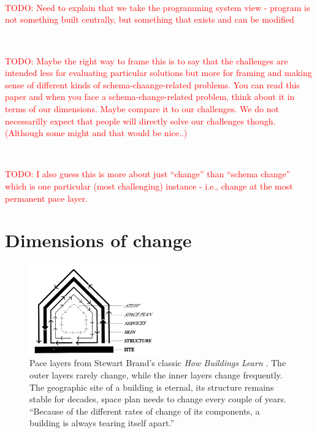 \documentclass[english,submission]{programming}
\begin{document}
~

~

~

\textcolor{red}{TODO: Need to explain that we take the programming system view - program is not something
built centrally, but something that exists and can be modified}

~

\textcolor{red}{TODO: Maybe the right way to frame this is to say that the challenges are intended
less for evaluating particular solutions but more for framing and making sense of different
kinds of schema-chaange-related problems.  You can read this paper and when you face a schema-change-related
problem, think about it in terms of our dimensions. Maybe compare it to our challenges.
We do not necessarilly expect that people will directly solve our challenges though. (Although
some might and that would be nice..)}

~

\textcolor{red}{TODO: I also guess this is more about just ``change'' than ``schema change''
which is one particular (most challenging) instance - i.e., change at the most permanent
pace layer.}

\newpage
\section{Dimensions of change}

\begin{figure}[t]
\vspace{-1em}
\centering
\includegraphics[width=0.5\textwidth]{figures/layers.png}
\caption{Pace layers from Stewart Brand's classic \emph{How Buildings Learn} \cite{Brand95}.
  The outer layers rarely change, while the inner layers change frequently. The geographic
  site of a building is eternal, its structure remains stable for decades, space plan
  needs to change every couple of years. ``Because of the different rates of change of its
  components, a building is always tearing itself apart.''}
\label{fig:layers}
\end{figure}
\end{document}
